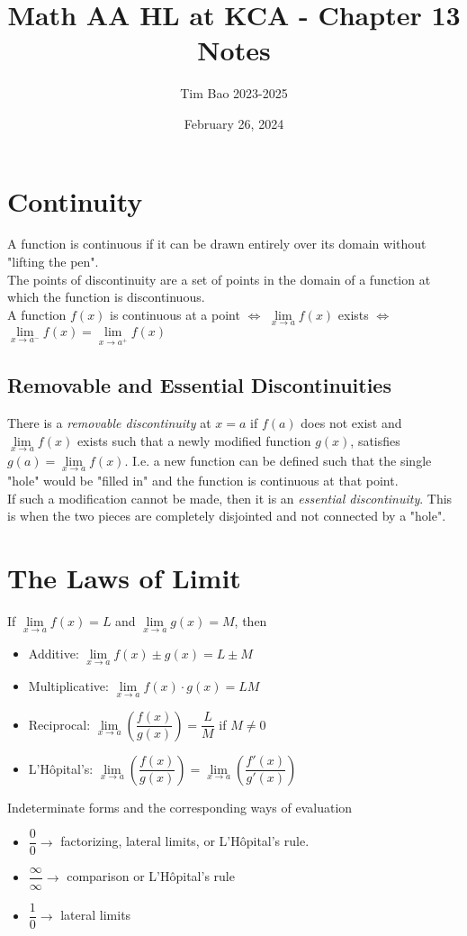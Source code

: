 \documentclass[11pt]{article}
\title{Math AA HL at KCA - Chapter 13 Notes}
\author{Tim Bao 2023-2025}
\date{February 26, 2024}
\newcommand{\lb}{\\[8pt]}
\begin{document}
\maketitle
\pagebreak
\tableofcontents
\pagebreak

\section{Continuity}

A function is continuous if it can be drawn entirely over its domain without "lifting the pen".\lb
The points of discontinuity are a set of points in the domain of a function at which the function is discontinuous.\lb
A function $f(x)$ is continuous at a point $\iff$ $\lim\limits_{x\to a}f(x)$ exists $\iff$ $\lim\limits_{x\to a^-}{f(x)} = \lim\limits_{x\to a^+}{f(x)}$

\subsection{Removable and Essential Discontinuities}

There is a \textit{removable discontinuity} at $x = a$ if $f(a)$ does not exist and $\lim\limits_{x\to a}f(x)$ exists such that a newly modified function $g(x)$, satisfies $g(a) = \lim\limits_{x \to a}f(x)$. I.e. a new function can be defined such that the single "hole" would be "filled in" and the function is continuous at that point.\lb
If such a modification cannot be made, then it is an \textit{essential discontinuity}. This is when the two pieces are completely disjointed and not connected by a "hole".

\pagebreak

\section{The Laws of Limit}

If $\lim\limits_{x\to a}{f(x)} = L$ and $\lim\limits_{x\to a}{g(x)} = M$, then
\begin{itemize}
  \item Additive: $\lim\limits_{x\to a}{f(x) \pm g(x)} = L\pm M$
  \item Multiplicative: $\lim\limits_{x\to a}{f(x) \cdot g(x)} = LM$
  \item Reciprocal: $\lim\limits_{x\to a}\left(\dfrac{f(x)}{g(x)}\right) = \dfrac{L}{M}$ if $M \not = 0$
  \item L'Hôpital's: $\lim\limits_{x\to a}\left(\dfrac{f(x)}{g(x)}\right) = \lim\limits_{x\to a}\left(\dfrac{f'(x)}{g'(x)}\right)$
\end{itemize}
\bigskip
Indeterminate forms and the corresponding ways of evaluation
\begin{itemize}
  \item $\dfrac{0}{0} \longrightarrow$ factorizing, lateral limits, or L'Hôpital's rule.
  \item $\dfrac{\infty}{\infty} \longrightarrow$ comparison or L'Hôpital's rule
  \item $\dfrac{1}{0} \longrightarrow$ lateral limits
\end{itemize}
\end{document}
